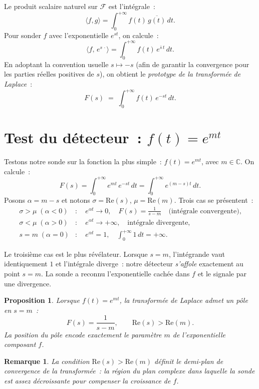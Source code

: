 \documentclass[11pt, a4paper]{article}
\theoremstyle{plain_style}
\newtheorem{proposition}{Proposition}
\newtheorem{remarque}{Remarque}
\begin{document}
Le produit scalaire naturel sur $\mathcal{F}$ est l'int\'{e}grale~:
\[
  \langle f, g \rangle = \int_0^{+\infty} f(t)\,\overline{g(t)}\,dt.
\]
Pour sonder $f$ avec l'exponentielle $e^{st}$, on calcule~:
\[
  \langle f,\, e^{s\,\cdot} \rangle
  = \int_0^{+\infty} f(t)\,e^{\bar{s}\,t}\,dt.
\]
En adoptant la convention usuelle $s \mapsto -s$ (afin de garantir la convergence
pour les parties r\'{e}elles positives de $s$), on obtient le
\emph{prototype de la transform\'{e}e de Laplace}~:
\[
  \boxed{F(s) \;=\; \int_0^{+\infty} f(t)\,e^{-st}\,dt.}
\]

\section{Test du d\'{e}tecteur~: \texorpdfstring{$f(t) = e^{mt}$}{f(t) = e^{mt}}}

Testons notre sonde sur la fonction la plus simple~: $f(t) = e^{mt}$,
avec $m \in \mathbb{C}$. On calcule~:
\[
  F(s) = \int_0^{+\infty} e^{mt}\,e^{-st}\,dt
       = \int_0^{+\infty} e^{(m-s)t}\,dt.
\]
Posons $\alpha = m - s$ et notons $\sigma = \mathrm{Re}(s)$, $\mu = \mathrm{Re}(m)$.
Trois cas se pr\'{e}sentent~:
\begin{align*}
  \sigma > \mu \;(\alpha < 0)
    &:\quad e^{\alpha t} \to 0,\quad
     F(s) = \frac{1}{s-m} \quad\text{(int\'{e}grale convergente),}\\[4pt]
  \sigma < \mu \;(\alpha > 0)
    &:\quad e^{\alpha t} \to +\infty,\quad\text{int\'{e}grale divergente,}\\[4pt]
  s = m \;(\alpha = 0)
    &:\quad e^{\alpha t} = 1,\quad
     \int_0^{+\infty} 1\,dt = +\infty.
\end{align*}

Le troisi\`{e}me cas est le plus r\'{e}v\'{e}lateur. Lorsque $s = m$, l'int\'{e}grande
vaut identiquement $1$ et l'int\'{e}grale diverge~: notre d\'{e}tecteur
\emph{s'affole} exactement au point $s = m$.
La sonde a reconnu l'exponentielle cach\'{e}e dans $f$ et le signale par une divergence.

\begin{proposition}
Lorsque $f(t) = e^{mt}$, la transform\'{e}e de Laplace admet un \emph{p\^{o}le} en $s = m$~:
\[
  F(s) = \frac{1}{s - m}, \qquad \mathrm{Re}(s) > \mathrm{Re}(m).
\]
La position du p\^{o}le encode exactement le param\`{e}tre $m$ de l'exponentielle composant $f$.
\end{proposition}

\begin{remarque}
La condition $\mathrm{Re}(s) > \mathrm{Re}(m)$ d\'{e}finit le \emph{demi-plan de convergence}
de la transform\'{e}e~: la r\'{e}gion du plan complexe dans laquelle la sonde est assez
d\'{e}croissante pour compenser la croissance de $f$.
\end{remarque}
\end{document}
